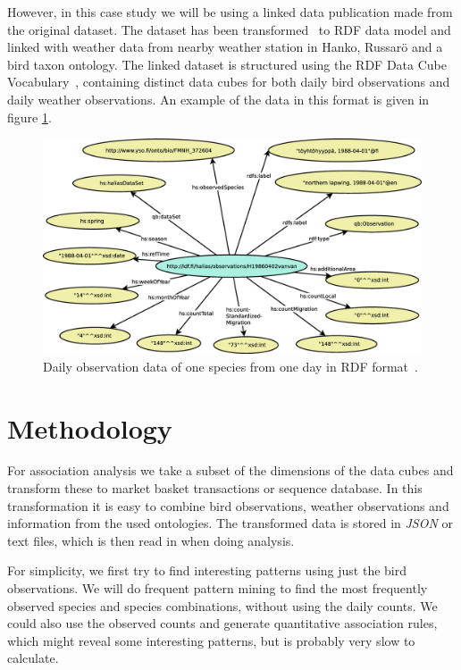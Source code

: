 \documentclass[english]{tktltiki2}
\begin{document}
However, in this case study we will be using a linked data publication made from the original dataset. The dataset has been transformed~\cite{koho-hyvonen-orni-2014, koho2015gradu} to RDF data model and linked with weather data from nearby weather station in Hanko, Russarö and a bird taxon ontology. %
The linked dataset is structured using the RDF Data Cube Vocabulary~\cite{w3crdfdatacube}, containing distinct data cubes for both daily bird observations and daily weather observations. An example of the data in this format is given in figure \ref{fig: havaintograafi}.

\begin{figure}[htb]
\centering
\includegraphics[clip=true, width=\textwidth]{havaintograafi}
\caption{Daily observation data of one species from one day in RDF format~\cite{koho2015gradu}.}
\label{fig: havaintograafi}
\end{figure}


\section{Methodology}

For association analysis we take a subset of the dimensions of the data cubes and transform these to market basket transactions or sequence database. In this transformation it is easy to combine bird observations, weather observations and information from the used ontologies. The transformed data is stored in \emph{JSON} or text files, which is then read in when doing analysis.

For simplicity, we first try to find interesting patterns using just the bird observations. We will do frequent pattern mining to find the most frequently observed species and species combinations, without using the daily counts. We could also use the observed counts and generate quantitative association rules, which might reveal some interesting patterns, but is probably very slow to calculate.
\end{document}
